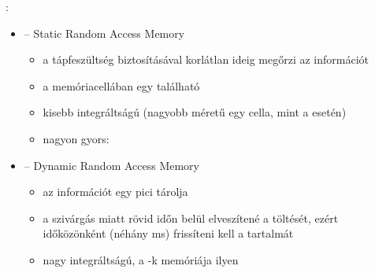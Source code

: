 \documentclass[main.tex]{subfiles}
\begin{document}
  {\large {}:}
  \begin{itemize}
    \item {} \tabto{1.8cm} – \tabto{2.5cm}
    Static Random Access Memory
    \begin{itemize}
      \item  a tápfeszültség biztosításával korlátlan
      ideig megőrzi az információt

      \item a memóriacellában egy  található
      
      \item kisebb integráltságú
      (nagyobb méretű egy cella, mint a  esetén)

      \item nagyon gyors: 
    \end{itemize}

    \item {} \tabto{1.8cm} – \tabto{2.5cm}
    Dynamic Random Access Memory
    \begin{itemize}
      \item az információt egy pici
       tárolja

      \item a szivárgás miatt rövid időn belül elveszítené a töltését,
      ezért időközönként (néhány ms) frissíteni kell a tartalmát

      \item nagy integráltságú, a -k memóriája ilyen
    \end{itemize}
  \end{itemize}
\end{document}
